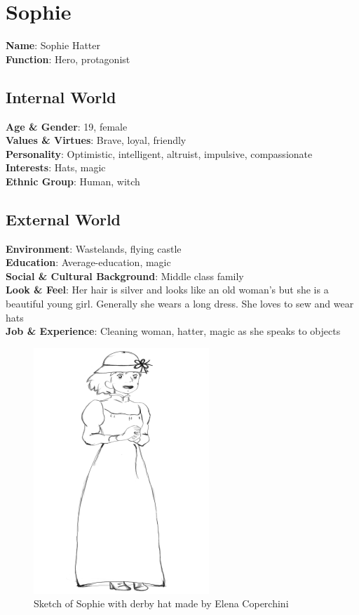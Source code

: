 \section{Sophie}

\begin{minipage}{0.5\textwidth}
\textbf{Name}: Sophie Hatter \\
\textbf{Function}: Hero, protagonist

\subsection{Internal World}

\textbf{Age \& Gender}: 19, female \\
\textbf{Values \& Virtues}: Brave, loyal, friendly \\
\textbf{Personality}: Optimistic, intelligent, altruist, impulsive, compassionate \\
\textbf{Interests}: Hats, magic \\
\textbf{Ethnic Group}: Human, witch

\subsection{External World}
\textbf{Environment}: Wastelands, flying castle \\
\textbf{Education}: Average-education, magic \\
\textbf{Social \& Cultural Background}: Middle class family \\
\textbf{Look \& Feel}: Her hair is silver and looks like an old woman's but she is a beautiful young girl. Generally she wears a long dress. She loves to sew and wear hats \\
\textbf{Job \& Experience}: Cleaning woman, hatter, magic as she speaks to objects \\

\end{minipage}%
%
\hfill\begin{minipage}{0.4\textwidth}
\begin{figure}[H]
  \includegraphics{Images/Characters/sophie_portrait}
  \caption{Sketch of Sophie with derby hat made by Elena Coperchini}
  \end{figure}
\end{minipage}

